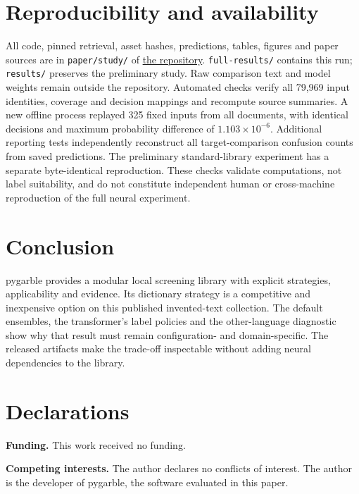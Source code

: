 \documentclass[10pt,a4paper,twocolumn]{article}
\begin{document}
\section{Reproducibility and
availability}\label{reproducibility-and-availability}

All code, pinned retrieval, asset hashes, predictions, tables, figures
and paper sources are in \texttt{paper/study/} of
\href{https://github.com/brightertiger/pygarble}{the repository}.
\texttt{full-results/} contains this run; \texttt{results/} preserves
the preliminary study. Raw comparison text and model weights remain
outside the repository. Automated checks verify all 79,969 input
identities, coverage and decision mappings and recompute source
summaries. A new offline process replayed 325 fixed inputs from all
documents, with identical decisions and maximum probability difference
of \(1.103\times10^{-6}\). Additional reporting tests independently
reconstruct all target-comparison confusion counts from saved
predictions. The preliminary standard-library experiment has a separate
byte-identical reproduction. These checks validate computations, not
label suitability, and do not constitute independent human or
cross-machine reproduction of the full neural experiment.

\section{Conclusion}\label{conclusion}

pygarble provides a modular local screening library with explicit
strategies, applicability and evidence. Its dictionary strategy is a
competitive and inexpensive option on this published invented-text
collection. The default ensembles, the transformer's label policies and
the other-language diagnostic show why that result must remain
configuration- and domain-specific. The released artifacts make the
trade-off inspectable without adding neural dependencies to the library.

\section*{Declarations}\label{declarations}

\textbf{Funding.} This work received no funding.

\textbf{Competing interests.} The author declares no conflicts of
interest. The author is the developer of pygarble, the software
evaluated in this paper.
\end{document}
